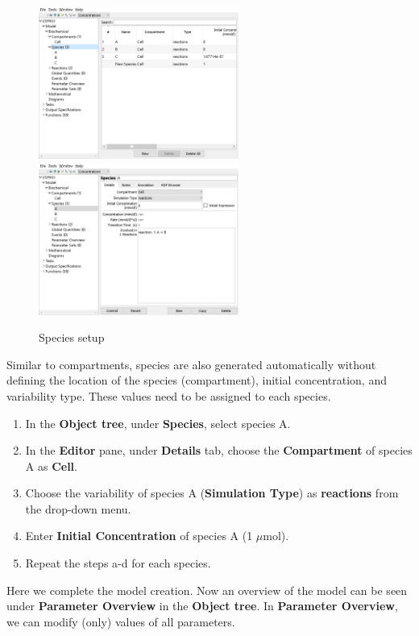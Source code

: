 \documentclass[10pt]{article}
\theoremstyle{definition}
\theoremstyle{remark}
\begin{document}
\begin{enumerate}
\begin{figure}[!htb]
			\centering
			\includegraphics[height=5cm]{Images/5a.png}
			\includegraphics[height=5cm]{Images/5b.png}
			\caption{Species setup}
			\label{5png}
		\end{figure}
Similar to compartments, species are also generated automatically without defining the location of the species (compartment), initial concentration, and variability type. These values need to be assigned to each species.
\begin{enumerate} 
			\item In the \textbf{Object tree}, under \textbf{Species}, select species A.
			\item In the \textbf{Editor} pane, under \textbf{Details} tab, choose the \textbf{Compartment} of species A as \textbf{Cell}. 
			\item Choose the variability of species A (\textbf{Simulation Type}) as \textbf{reactions} from the drop-down menu.
			\item Enter \textbf{Initial Concentration} of species A (1 $\mu$mol).
			\item Repeat the steps a-d for each species.\\
		\end{enumerate}
	\end{enumerate}
Here we complete the model creation. Now an overview of the model can be seen under \textbf{Parameter Overview} in the \textbf{Object tree}. In \textbf{Parameter Overview}, we can modify (only) values of all parameters.
\end{document}
